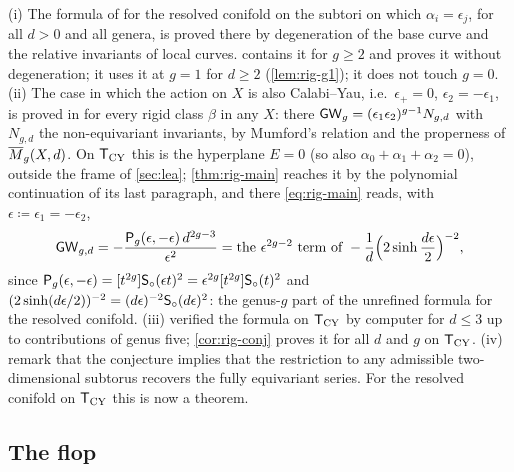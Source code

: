 \begin{rmk}
\label{rmk:rig-BS}
(i) The formula of \cite{BS} for the resolved conifold on the subtori on which $\alpha_i=\epsilon_j$, for all $d>0$ and all genera, is proved there by degeneration of the base curve and the relative invariants of local curves.  contains it for $g\geq 2$ and proves it without degeneration; it uses it at $g=1$ for $d\geq 2$ (\cref{lem:rig-g1}); it does not touch $g=0$. 
(ii) The case in which the action on $X$ is also Calabi--Yau, i.e.\ $\epsilon_+=0$, $\epsilon_2=-\epsilon_1$, is proved in \cite{BS} for every rigid class $\beta$ in any $X$: there $\mathsf{GW}_g=(\epsilon_1\epsilon_2)^{g-1}N_{g,d}$ with $N_{g,d}$ the non-equivariant invariants, by Mumford's relation and the properness of $\overline{M}_g(X,d)$. On $\mathsf{T}_{\mathrm{CY}}$ this is the hyperplane $E=0$ (so also $\alpha_0+\alpha_1+\alpha_2=0$), outside the frame of \cref{sec:lea}; \cref{thm:rig-main} reaches it by the polynomial continuation of its last paragraph, and there \eqref{eq:rig-main} reads, with $\epsilon\coloneqq\epsilon_1=-\epsilon_2$,
\[
\mathsf{GW}_{g,d}=-\frac{\mathsf{P}_{g}(\epsilon,-\epsilon)\,d^{2g-3}}{\epsilon^2}=\text{the }\epsilon^{2g-2}\text{ term of }-\frac{1}{d}\Big(2\sinh\frac{d\epsilon}{2}\Big)^{-2},
\]
since $\mathsf{P}_{g}(\epsilon,-\epsilon)=[t^{2g}]\mathsf{S}_{\circ}(\epsilon t)^2=\epsilon^{2g}[t^{2g}]\mathsf{S}_{\circ}(t)^2$ and $(2\sinh(d\epsilon/2))^{-2}=(d\epsilon)^{-2}\mathsf{S}_{\circ}(d\epsilon)^2$: the genus-$g$ part of the unrefined formula for the resolved conifold. 
(iii) \cite{BS} verified the formula on $\mathsf{T}_{\mathrm{CY}}$ by computer for $d\leq 3$ up to contributions of genus five; \cref{cor:rig-conj} proves it for all $d$ and $g$ on $\mathsf{T}_{\mathrm{CY}}$.
(iv) \cite{BS} remark that the conjecture implies that the restriction to any admissible two-dimensional subtorus recovers the fully equivariant series. For the resolved conifold on $\mathsf{T}_{\mathrm{CY}}$ this is now a theorem.
\end{rmk}

\subsection{The flop}

